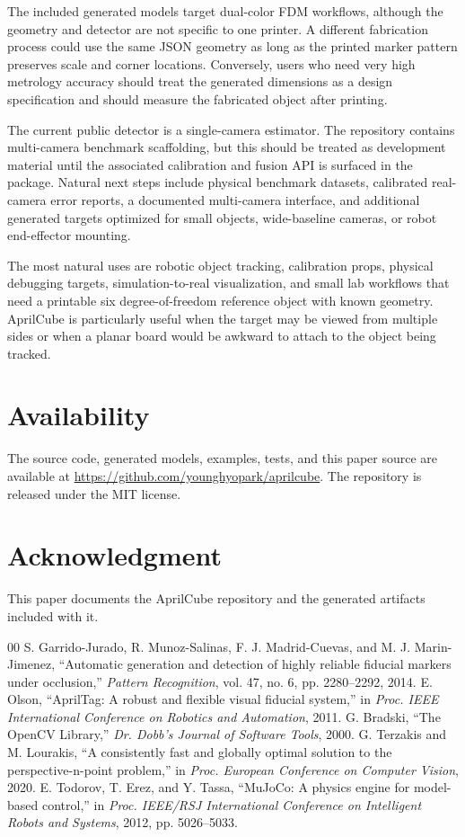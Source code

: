 \documentclass[conference]{IEEEtran}
\begin{document}
The included generated models target dual-color FDM workflows, although the geometry and detector are not specific to one printer. A different fabrication process could use the same JSON geometry as long as the printed marker pattern preserves scale and corner locations. Conversely, users who need very high metrology accuracy should treat the generated dimensions as a design specification and should measure the fabricated object after printing.

The current public detector is a single-camera estimator. The repository contains multi-camera benchmark scaffolding, but this should be treated as development material until the associated calibration and fusion API is surfaced in the package. Natural next steps include physical benchmark datasets, calibrated real-camera error reports, a documented multi-camera interface, and additional generated targets optimized for small objects, wide-baseline cameras, or robot end-effector mounting.

The most natural uses are robotic object tracking, calibration props, physical debugging targets, simulation-to-real visualization, and small lab workflows that need a printable six degree-of-freedom reference object with known geometry. AprilCube is particularly useful when the target may be viewed from multiple sides or when a planar board would be awkward to attach to the object being tracked.

\section{Availability}
The source code, generated models, examples, tests, and this paper source are available at \url{https://github.com/younghyopark/aprilcube}. The repository is released under the MIT license.

\section*{Acknowledgment}
This paper documents the AprilCube repository and the generated artifacts included with it.

\begin{thebibliography}{00}
 S. Garrido-Jurado, R. Munoz-Salinas, F. J. Madrid-Cuevas, and M. J. Marin-Jimenez, ``Automatic generation and detection of highly reliable fiducial markers under occlusion,'' \textit{Pattern Recognition}, vol. 47, no. 6, pp. 2280--2292, 2014.
 E. Olson, ``AprilTag: A robust and flexible visual fiducial system,'' in \textit{Proc. IEEE International Conference on Robotics and Automation}, 2011.
 G. Bradski, ``The OpenCV Library,'' \textit{Dr. Dobb's Journal of Software Tools}, 2000.
 G. Terzakis and M. Lourakis, ``A consistently fast and globally optimal solution to the perspective-n-point problem,'' in \textit{Proc. European Conference on Computer Vision}, 2020.
 E. Todorov, T. Erez, and Y. Tassa, ``MuJoCo: A physics engine for model-based control,'' in \textit{Proc. IEEE/RSJ International Conference on Intelligent Robots and Systems}, 2012, pp. 5026--5033.
\end{thebibliography}
\end{document}
